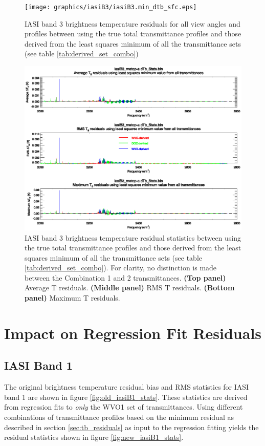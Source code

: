 \begin{figure}[htp]
  \centering
  \texttt{[image: graphics/iasiB3/iasiB3.min\_dtb\_sfc.eps]}
  \caption{IASI band 3 brightness temperature residuals for all view angles and profiles between using the true total transmittance profiles and those derived from the least squares minimum of all the transmittance sets (see table \ref{tab:derived_set_combo})}
  \label{fig:iasiB3.min_dtb_sfc}
  \vspace{1em}
  \includegraphics[scale=0.8]{graphics/iasiB3/iasiB3.min_dtb.eps}
  \caption{IASI band 3 brightness temperature residual statistics between using the true total transmittance profiles and those derived from the least squares minimum of all the transmittance sets (see table \ref{tab:derived_set_combo}). For clarity, no distinction is made between the Combination 1 and 2 transmittances. \textbf{(Top panel)} Average T residuals. \textbf{(Middle panel)} RMS T residuals. \textbf{(Bottom panel)} Maximum T residuals.}
  \label{fig:iasiB3.min_dtb}
\end{figure}



\section{Impact on Regression Fit Residuals}
\subsection{IASI Band 1}
The original brightness temperature residual bias and RMS statistics for IASI band 1 are shown in figure \ref{fig:old_iasiB1_stats}. These statistics are derived from regression fits to \emph{only} the WVO1 set of transmittances. Using different combinations of transmittance profiles based on the minimum residual as described in section \ref{sec:tb_residuals} as input to the regression fitting yields the residual statistics shown in figure \ref{fig:new_iasiB1_stats}.

